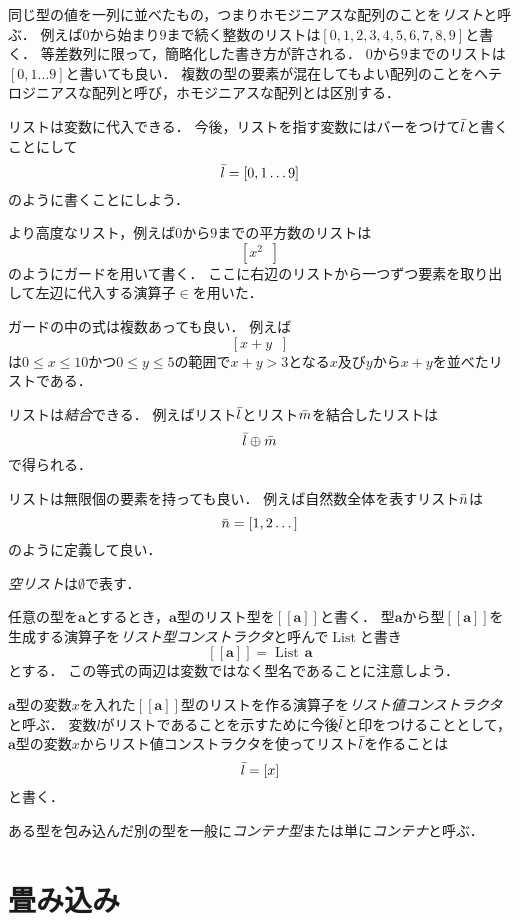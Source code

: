 \documentclass[twocolumn]{jsbook}
\def\[{[\![}
\def\]{]\!]}
\newcommand{\hsklType}[1]{\textbf{#1}}
\newcommand{\hsklTypeConstructor}[1]{\mathop{\mathrm{#1}}}
\DeclareMathOperator{\hsklListConstructor}{\hsklTypeConstructor{List}}
\newcommand{\hsklAppend}{\oplus}
\newcommand{\hsklEmptyList}{\emptyset}
\newcommand{\hsklList}[1]{\Bar{#1}}
\newcommand{\hsklListType}[1]{\[#1\]}
\newcommand{\hsklTypeConstruct}[2]{#1\,#2}
\DeclareMathOperator{\mathFrom}{\in}
\newcommand{\mathGuard}[1]{\mathop{\mid_{#1}}}
\newcommand{\keyword}[1]{\emph{#1}}
\begin{document}
同じ型の値を一列に並べたもの，つまりホモジニアスな配列のことを\keyword{リスト}と呼ぶ．
例えば$0$から始まり$9$まで続く整数のリストは$[0,1,2,3,4,5,6,7,8,9]$と書く．
等差数列に限って，簡略化した書き方が許される．
$0$から$9$までのリストは$[0,1\dots9]$と書いても良い．
複数の型の要素が混在してもよい配列のことをヘテロジニアスな配列と呼び，ホモジニアスな配列とは区別する．

リストは変数に代入できる．
今後，リストを指す変数にはバーをつけて$\hsklList{l}$と書くことにして$$\hsklList{l}=[0,1\dots9]$$のように書くことにしよう．

より高度なリスト，例えば$0$から$9$までの平方数のリストは$$\left[x^2\mathGuard{x\mathFrom{[0,1\dots9]}}\right]$$のようにガードを用いて書く．
ここに右辺のリストから一つずつ要素を取り出して左辺に代入する演算子$\mathFrom$を用いた．

ガードの中の式は複数あっても良い．
例えば$$\left[x+y\mathGuard{x\mathFrom[0,1\dots9],\,y\mathFrom[0,1\dots5],\,x+y>3}\right]$$は$0\le x\le 10$かつ$0\le y\le 5$の範囲で$x+y>3$となる$x$及び$y$から$x+y$を並べたリストである．

リストは\keyword{結合}できる．
例えばリスト$\hsklList{l}$とリスト$\hsklList{m}$を結合したリストは$$\hsklList{l}\hsklAppend\hsklList{m}$$で得られる．

リストは無限個の要素を持っても良い．
例えば自然数全体を表すリスト$\hsklList{n}$は$$\hsklList{n}=[1,2\dots]$$のように定義して良い．

\keyword{空リスト}は$\hsklEmptyList$で表す．

任意の型を$\hsklType{a}$とするとき，$\hsklType{a}$型のリスト型を$\hsklListType{\hsklType{a}}$と書く．
型$\hsklType{a}$から型$\hsklListType{\hsklType{a}}$を生成する演算子を\keyword{リスト型コンストラクタ}と呼んで$\hsklListConstructor$と書き$$\hsklListType{\hsklType{a}}=\hsklTypeConstruct{\hsklListConstructor}{\hsklType{a}}$$とする．
この等式の両辺は変数ではなく型名であることに注意しよう．

$\hsklType{a}$型の変数$x$を入れた$\hsklListType{\hsklType{a}}$型のリストを作る演算子を\keyword{リスト値コンストラクタ}と呼ぶ．
変数$l$がリストであることを示すために今後$\hsklList{l}$と印をつけることとして，$\hsklType{a}$型の変数$x$からリスト値コンストラクタを使ってリスト$\hsklList{l}$を作ることは$$\hsklList{l}=[x]$$と書く．

ある型を包み込んだ別の型を一般に\keyword{コンテナ型}または単に\keyword{コンテナ}と呼ぶ．

\section{畳み込み}
\end{document}
